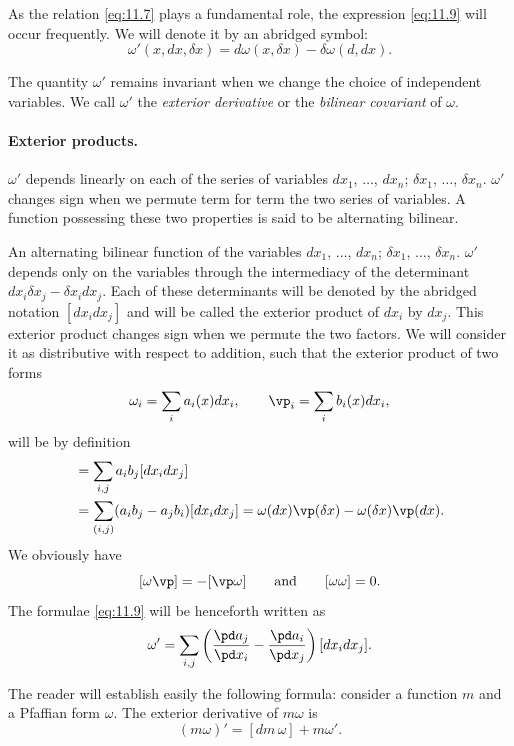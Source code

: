 As the relation \eqref{eq:11.7} plays a fundamental role, the expression \eqref{eq:11.9} will occur frequently. We will denote it by an abridged symbol:
\begin{equation}
  \label{eq:11.10}
  \omega'(x,dx,\delta x)=d\omega(x,\delta x)-\delta\omega(d,dx).
\end{equation}

The quantity $\omega'$ remains invariant when we change the choice of independent variables. We call $\omega'$ the \emph{exterior derivative} or the \emph{bilinear covariant} of $\omega$.

\paragraph{Exterior products.}
\label{sec:156}
$\omega'$ depends linearly on each of the series of variables $dx_{1}$, $\dots$, $dx_{n}$; $\delta x_{1}$, $\dots$, $\delta x_{n}$. $\omega'$ changes sign when we permute term for term the two series of variables. A function possessing these two properties is said to be alternating bilinear.

An alternating bilinear function of the variables $dx_{1}$, $\dots$, $dx_{n}$; $\delta x_{1}$, $\dots$, $\delta x_{n}$. $\omega'$ depends only on the variables through the intermediacy of the determinant $dx_{i}\delta x_{j}-\delta x_{i}dx_{j}$. Each of these determinants will be denoted by the abridged notation $[dx_{i}dx_{j}]$ and will be called the exterior product of $dx_{i}$ by $dx_{j}$. This exterior product changes sign when we permute the two factors. We will consider it as distributive with respect to addition, such that the exterior product of two forms
\[
\omega_{i}=\sum_{i}a_{i}(x)dx_{i},\qquad\vp_{i}=\sum_{i}b_{i}(x)dx_{i},
\]
will be by definition
\begin{align*}
  [\omega\vp]&=\sum_{i,j}a_{i}b_{j}[dx_{i}dx_{j}]\\
  &=\sum_{(i,j)}(a_{i}b_{j}-a_{j}b_{i})[dx_{i}dx_{j}]=\omega(dx)\vp(\delta x)-\omega(\delta x)\vp(dx).
\end{align*}
We obviously have
\[
[\omega\vp]=-[\vp\omega]\qquad\text{and}\qquad[\omega\omega]=0.
\]
The formulae \eqref{eq:11.9} will be henceforth written as
\[
\omega'=\sum_{i,j}\left(\frac{\pd a_{j}}{\pd x_{i}}-\frac{\pd a_{i}}{\pd x_{j}}\right)[dx_{i}dx_{j}].
\]

The reader will establish easily the following formula: consider a function $m$ and a Pfaffian form $\omega$. The exterior derivative of $m\omega$ is
\begin{equation}
  \label{eq:11.11}
  (m\omega)'=[dm\,\omega]+m\omega'.
\end{equation}

